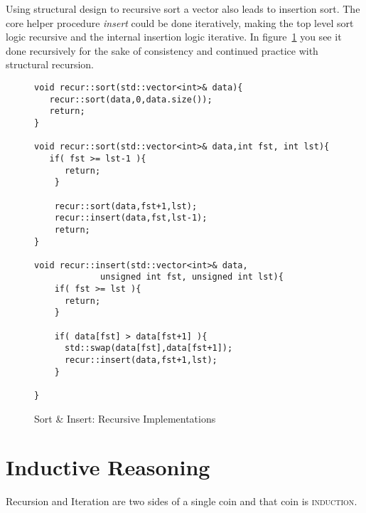 \documentclass[nobib]{tufte-handout}
\begin{document}
Using structural design to recursive sort a vector also leads to insertion sort.  The core helper procedure \textit{insert} could be done iteratively, making the top level sort logic recursive and the internal insertion logic iterative.  In figure~\ref{code:isortrec} you see it done recursively for the sake of consistency and continued practice with structural recursion.

\begin{figure}
\begin{lstlisting}
void recur::sort(std::vector<int>& data){
   recur::sort(data,0,data.size());
   return;
}

void recur::sort(std::vector<int>& data,int fst, int lst){
   if( fst >= lst-1 ){
      return;
    }

    recur::sort(data,fst+1,lst);
    recur::insert(data,fst,lst-1);
    return;
}

void recur::insert(std::vector<int>& data,
		     unsigned int fst, unsigned int lst){
    if( fst >= lst ){
      return;
    }

    if( data[fst] > data[fst+1] ){
      std::swap(data[fst],data[fst+1]);
      recur::insert(data,fst+1,lst);
    }

}
\end{lstlisting}
\label{code:isortrec}
\caption{Sort \& Insert: Recursive Implementations}
\end{figure}

\section{Inductive Reasoning}

Recursion and Iteration are two sides of a single coin and that coin is \textsc{induction}.
\end{document}
